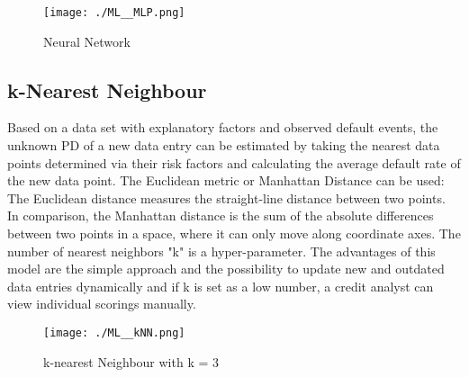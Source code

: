 \begin{figure}[H]
	\centering
	\texttt{[image: ./ML\_\_MLP.png]}
    \caption{Neural Network}
    \label{fig:ml_neurnet}
\end{figure}

\subsection{k-Nearest Neighbour}
\label{sec:kNN}
Based on a data set with explanatory factors and observed default events, the unknown PD of a new data entry can be estimated by taking the nearest data points determined via their risk factors and calculating the average default rate of the new data point. The Euclidean metric or Manhattan Distance can be used: The Euclidean distance measures the straight-line distance between two points. In comparison, the Manhattan distance is the sum of the absolute differences between two points in a space, where it can only move along coordinate axes. The number of nearest neighbors "k" is a hyper-parameter. The advantages of this model are the simple approach and the possibility to update new and outdated data entries dynamically and if k is set as a low number, a credit analyst can view individual scorings manually. \cite[p.~83]{Witzany:2017}

\begin{figure}[H]
	\centering
	\texttt{[image: ./ML\_\_kNN.png]}
    \caption{k-nearest Neighbour with k = 3}
    \label{fig:ml_neurnet}
\end{figure}